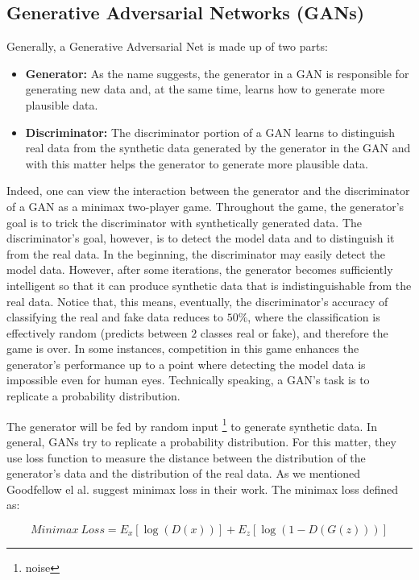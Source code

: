\subsection{Generative Adversarial Networks (GANs)}
\label{tit:Generative-Adversarial-Network}
Generally, a Generative Adversarial Net is made up of two parts:
\begin{itemize}
\item{\textbf{Generator:}} As the name suggests, the generator in a GAN is responsible for generating new data and, at the same time, learns how to generate more plausible data. 
\item{\textbf{Discriminator:}} The discriminator portion of a GAN learns to distinguish real data from the synthetic data generated 
by the generator in the GAN and with this matter helps the generator to generate more plausible data.
\end{itemize}

Indeed, one can view the interaction between the generator and the discriminator of a GAN as a
minimax two-player game. Throughout the game, the generator's goal is to trick the discriminator
with synthetically generated data. The discriminator's goal, however, is to detect the model data
and to distinguish it from the real data. In the beginning, the discriminator may easily detect the
model data. However, after some iterations, the generator becomes sufficiently intelligent so that
it can produce synthetic data that is indistinguishable from the real data. Notice that, this means,
eventually, the discriminator's accuracy of classifying the real and fake data reduces to $50\%$,
where the classification is effectively random (predicts between $2$ classes
real or fake), and therefore the game is over. In some instances,
competition in this game enhances the generator's performance up to a point where detecting the
model data is impossible even for human eyes.
Technically speaking,  a GAN's task is to replicate a probability distribution.

The generator will be fed by random input \footnote{noise} to generate synthetic data. In general, GANs try to replicate a probability distribution. For this matter, they use loss function to measure the distance between the distribution of the generator's data and the distribution of the real data. As we mentioned Goodfellow el al. \cite{goodflew_bayesian_approach} suggest minimax loss in their work. The minimax loss defined as:

\begin{equation} \label{eq:minimax_loss}
  Minimax\ Loss = E_{x}[\log (D(x))]+E_{z}[\log (1-D(G(z)))]
\end{equation}


